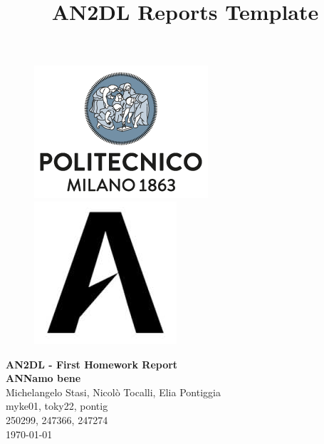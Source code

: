 \documentclass[11pt]{article}
\title{AN2DL Reports Template}
\begin{document}
\begin{figure}[H]
    \raggedright
    \includegraphics[scale=0.4]{polimi.png} \hfill \includegraphics[scale=0.3]{airlab.jpeg}
\end{figure}

\vspace{5mm}

\begin{center}
    {\Large \textbf{AN2DL - First Homework Report}}\\
    \vspace{2mm}
    {\Large \textbf{ANNamo bene}}\\
    \vspace{2mm}
    {\large Michelangelo Stasi,}
    {\large Nicolò Tocalli,}
    {\large Elia Pontiggia}\\
    \vspace{2mm}
    {myke01,}
    {toky22,}
    {pontig}\\
    \vspace{2mm}
    {250299,}
    {247366,}
    {247274}\\
    \vspace{5mm}
    \today
\end{center}
\vspace{5mm}
\end{document}
